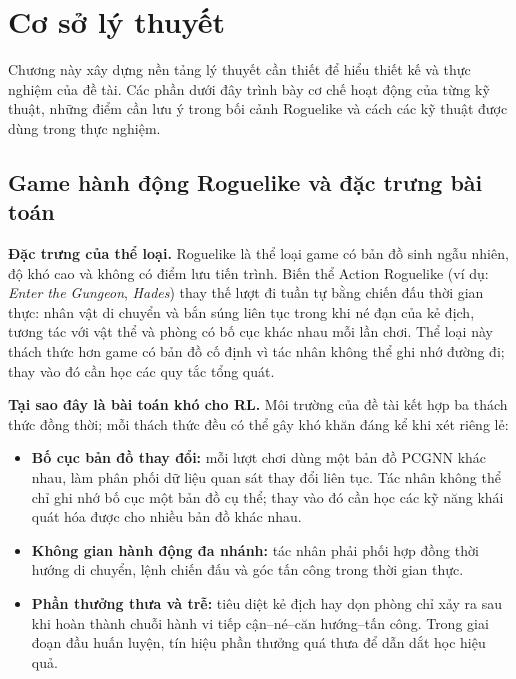 \clearpage
{}

\setcounter{chapter}{0}
\chapter[{Cơ sở lý thuyết}]{Cơ sở lý thuyết}

Chương này xây dựng nền tảng lý thuyết cần thiết để hiểu thiết kế và thực nghiệm của đề tài. Các phần dưới đây trình bày cơ chế hoạt động của từng kỹ thuật, những điểm cần lưu ý trong bối cảnh Roguelike và cách các kỹ thuật được dùng trong thực nghiệm.

\section{Game hành động Roguelike và đặc trưng bài toán}

\textbf{Đặc trưng của thể loại.} Roguelike là thể loại game có bản đồ sinh ngẫu nhiên, độ khó cao và không có điểm lưu tiến trình. Biến thể Action Roguelike (ví dụ: \textit{Enter the Gungeon}, \textit{Hades}) thay thế lượt đi tuần tự bằng chiến đấu thời gian thực: nhân vật di chuyển và bắn súng liên tục trong khi né đạn của kẻ địch, tương tác với vật thể và phòng có bố cục khác nhau mỗi lần chơi. Thể loại này thách thức hơn game có bản đồ cố định vì tác nhân không thể ghi nhớ đường đi; thay vào đó cần học các quy tắc tổng quát.

\textbf{Tại sao đây là bài toán khó cho RL.} Môi trường của đề tài kết hợp ba thách thức đồng thời; mỗi thách thức đều có thể gây khó khăn đáng kể khi xét riêng lẻ:

\begin{itemize}
    \item \textbf{Bố cục bản đồ thay đổi:} mỗi lượt chơi dùng một bản đồ PCGNN khác nhau, làm phân phối dữ liệu quan sát thay đổi liên tục. Tác nhân không thể chỉ ghi nhớ bố cục một bản đồ cụ thể; thay vào đó cần học các kỹ năng khái quát hóa được cho nhiều bản đồ khác nhau.
    \item \textbf{Không gian hành động đa nhánh:} tác nhân phải phối hợp đồng thời hướng di chuyển, lệnh chiến đấu và góc tấn công trong thời gian thực.
    \item \textbf{Phần thưởng thưa và trễ:} tiêu diệt kẻ địch hay dọn phòng chỉ xảy ra sau khi hoàn thành chuỗi hành vi tiếp cận--né--căn hướng--tấn công. Trong giai đoạn đầu huấn luyện, tín hiệu phần thưởng quá thưa để dẫn dắt học hiệu quả.
\end{itemize}

